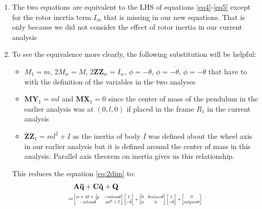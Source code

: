 \documentclass[a4paper,10pt]{article}
\newcommand\scalemath[2]{\scalebox{#1}{\mbox{\ensuremath{\displaystyle #2}}}}
\begin{document}
\begin{enumerate}[label=(\roman*)]
 \item The two equations are equivalent to the LHS of equations \ref{eq4}-\ref{eq5} except for the rotor inertia term $I_m$
 that is missing in our new equations. That is only because we did not consider the effect of rotor inertia in our current analysis
 \item To see the equivalence more clearly, the following substitution will be helpful: 
 \begin{itemize}
  \item $M_1 = m$, $2M_w = M$, $2\mathbf{ZZ}_w=I_w$, $\phi=-\theta$, $\dot{\phi} = -\dot{\theta}$, $\ddot{\phi}=-\ddot{\theta}$ that have 
  to with the definition of the variables in the two analyses
  \item $\mathbf{MY}_1 = ml$ and $\mathbf{MX}_1 = 0$ since the center of mass of the pendulum in the earlier analysis was at 
  $(0,l,0)$ if placed in the frame $R_1$ in the current analysis
  \item $\mathbf{ZZ}_1 = ml^2+I$ as the inertia of body $I$ was defined about the wheel axis in our earlier analysis but it
  is defined around the center of mass in this analysis. Parallel axis theorem on inertia gives us this relationship.
 \end{itemize}
 This reduces the equation \ref{eq:2dim} to:
 \begin{align} \begin{split}
 &\mathbf{A\ddot{q}+C\dot{q}+Q} \\ = &\scalemath{0.6}{\left[ \begin{matrix} m+M+\frac{I_w}{R^2} & -mlcos\theta \\ 
   -mlcos\theta  & ml^2+I \end{matrix} \right] \left[\begin{matrix} \ddot{x} \\ -\ddot{\theta} \end{matrix} \right]
   + \left[ \begin{matrix} 0 & \dot{\theta}mlsin\theta \\ 0 & 0 \end{matrix} \right] \left[\begin{matrix} \dot{x} \\ -\dot{\theta} \end{matrix} \right]
   + \left[ \begin{matrix} 0 \\ mlgsin\theta \end{matrix} \right]} \\

\end{split}
\end{align}
\end{enumerate}
\end{document}
